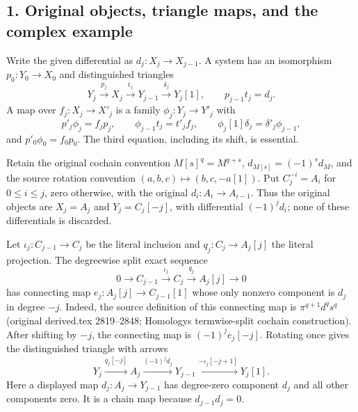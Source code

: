 \documentclass[11pt]{article}
\begin{document}
\subsection{\texorpdfstring{1. Original objects,\allowbreak{} triangle maps,\allowbreak{} and the complex example}{1. Original  triangle  and the complex example}}\label{proofs-12008-12370-original-objects-triangle-maps-and-the-complex-example}

Write the given differential as \(d_j:X_j\to X_{j-1}\). A system has an isomorphism \(p_0:Y_0\to X_0\) and distinguished triangles \[
Y_j\xrightarrow{p_j}X_j\xrightarrow{t_j}Y_{j-1}
 \xrightarrow{\delta_j}Y_j[1],\qquad p_{j-1}t_j=d_j. \tag{1.1}
\] A map over \(f_j:X_j\to X'_j\) is a family \(\phi_j:Y_j\to Y'_j\) with \[
p'_j\phi_j=f_jp_j,\qquad
\phi_{j-1}t_j=t'_jf_j,\qquad
\phi_j[1]\delta_j=\delta'_j\phi_{j-1}, \tag{1.2}
\] and \(p'_0\phi_0=f_0p_0\). The third equation,\allowbreak{} including its shift,\allowbreak{} is essential.

Retain the original cochain convention \(M[s]^q=M^{q+s}\),\allowbreak{} \(d_{M[s]}=(-1)^s d_M\),\allowbreak{} and the source rotation convention \((a,b,c)\mapsto(b,c,-a[1])\). Put \(C_j^{-i}=A_i\) for \(0\leq i\leq j\),\allowbreak{} zero otherwise,\allowbreak{} with the original \(d_i:A_i\to A_{i-1}\). Thus the original objects are \(X_j=A_j\) and \(Y_j=C_j[-j]\),\allowbreak{} with differential \((-1)^j d_i\); none of these differentials is discarded.

Let \(\iota_j:C_{j-1}\to C_j\) be the literal inclusion and \(q_j:C_j\to A_j[j]\) the literal projection. The degreewise split exact sequence \[
0\longrightarrow C_{j-1}\xrightarrow{\iota_j}C_j
 \xrightarrow{q_j}A_j[j]\longrightarrow0
\] has connecting map \(e_j:A_j[j]\to C_{j-1}[1]\) whose only nonzero component is \(d_j\) in degree \(-j\). Indeed,\allowbreak{} the source definition of this connecting map is \(\pi^{q+1}d^q s^q\) (original derived.tex 2819–\allowbreak{}2848; Homology\textquotesingle s termwise-split cochain construction)\allowbreak{}. After shifting by \(-j\),\allowbreak{} the connecting map is \((-1)^j e_j[-j]\). Rotating once gives the distinguished triangle with arrows \[
Y_j\xrightarrow{q_j[-j]}A_j
 \xrightarrow{(-1)^j d_j}Y_{j-1}
 \xrightarrow{-\iota_j[-j+1]}Y_j[1]. \tag{1.3}
\] Here a displayed map \(d_j:A_j\to Y_{j-1}\) has degree-zero component \(d_j\) and all other components zero. It is a chain map because \(d_{j-1}d_j=0\).
\end{document}
